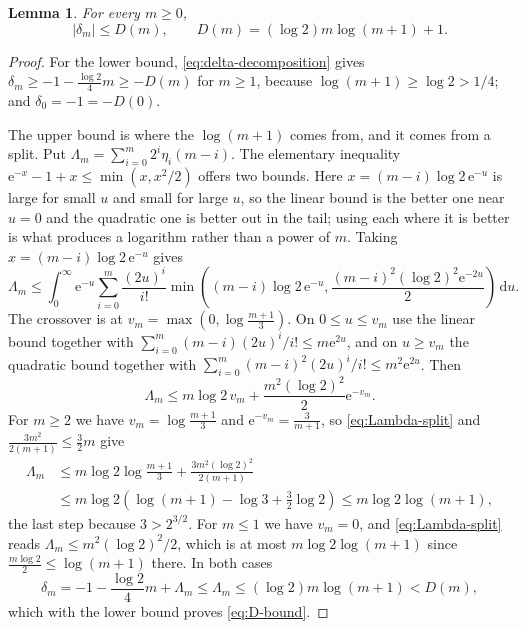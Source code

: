 \documentclass[11pt]{amsart}
\theoremstyle{plain}
\newtheorem{lemma}[theorem]{Lemma}
\theoremstyle{definition}
\newcommand{\e}{\mathrm e}
\newcommand{\dd}{\,\mathrm d}
\newcommand{\abs}[1]{\lvert #1\rvert}
\begin{document}
\begin{lemma}\label{lem:delta-bound}
For every $m\geq0$,
\begin{equation}\label{eq:D-bound}
 \abs{\delta_m}\leq D(m),
 \qquad
 D(m)=(\log2)m\log(m+1)+1.
\end{equation}
\end{lemma}

\begin{proof}
For the lower bound, \eqref{eq:delta-decomposition} gives
$\delta_m\geq-1-\frac{\log2}{4}m\geq-D(m)$ for $m\geq1$, because
$\log(m+1)\geq\log2>1/4$; and $\delta_0=-1=-D(0)$.

The upper bound is where the $\log(m+1)$ comes from, and it comes from a
split. Put $\Lambda_m=\sum_{i=0}^m2^i\eta_i(m-i)$. The elementary inequality
$\e^{-x}-1+x\leq\min(x,x^2/2)$ offers two bounds. Here
$x=(m-i)\log2\,\e^{-u}$ is large for small $u$ and small for large $u$, so the
linear bound is the better one near $u=0$ and the quadratic one is better out
in the tail; using each where it is better is what produces a logarithm rather
than a power of $m$. Taking
$x=(m-i)\log2\,\e^{-u}$ gives
\begin{equation}\label{eq:Lambda-integral-bound}
 \Lambda_m\leq\int_0^\infty \e^{-u}\sum_{i=0}^m\frac{(2u)^i}{i!}
 \min\left((m-i)\log2\,\e^{-u},
 \frac{(m-i)^2(\log2)^2\e^{-2u}}2\right)\dd u.
\end{equation}
The crossover is at $v_m=\max\left(0,\log\frac{m+1}{3}\right)$. On
$0\leq u\leq v_m$ use the linear bound together with $\sum_{i=0}^m(m-i)(2u)^i/i!\leq m\e^{2u}$, and on
$u\geq v_m$ the quadratic bound together with
$\sum_{i=0}^m(m-i)^2(2u)^i/i!\leq m^2\e^{2u}$. Then
\begin{equation}\label{eq:Lambda-split}
 \Lambda_m\leq m\log2\,v_m+\frac{m^2(\log2)^2}{2}\e^{-v_m}.
\end{equation}
For $m\geq2$ we have $v_m=\log\frac{m+1}{3}$ and $\e^{-v_m}=\frac3{m+1}$, so
\eqref{eq:Lambda-split} and $\frac{3m^2}{2(m+1)}\leq\frac32m$ give
\begin{align*}
 \Lambda_m&\leq m\log2\log\frac{m+1}{3}+\frac{3m^2(\log2)^2}{2(m+1)}\\
 &\leq m\log2\left(\log(m+1)-\log3+\tfrac32\log2\right)
 \leq m\log2\log(m+1),
\end{align*}
the last step because $3>2^{3/2}$. For $m\leq1$ we have $v_m=0$, and
\eqref{eq:Lambda-split} reads $\Lambda_m\leq m^2(\log2)^2/2$, which is at most
$m\log2\log(m+1)$ since $\frac{m\log2}{2}\leq\log(m+1)$ there. In both cases
\[
 \delta_m=-1-\frac{\log2}{4}m+\Lambda_m\leq \Lambda_m\leq(\log2)m\log(m+1)<D(m),
\]
which with the lower bound proves \eqref{eq:D-bound}.
\end{proof}
\end{document}
